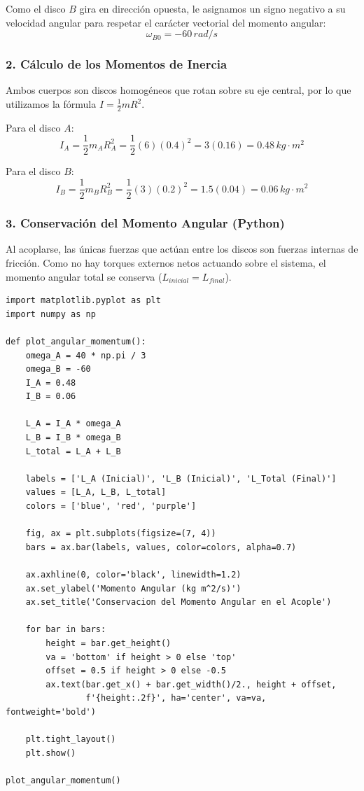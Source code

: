\documentclass[12pt, a4paper]{article}
\begin{document}
Como el disco $B$ gira en dirección opuesta, le asignamos un signo negativo a su velocidad angular para respetar el carácter vectorial del momento angular:
$$\omega_{B0} = -60 \, \si{rad/s}$$

\subsubsection*{2. Cálculo de los Momentos de Inercia}
Ambos cuerpos son discos homogéneos que rotan sobre su eje central, por lo que utilizamos la fórmula $I = \frac{1}{2} m R^2$.

Para el disco $A$:
$$I_A = \frac{1}{2} m_A R_A^2 = \frac{1}{2} (6) (0.4)^2 = 3 (0.16) = 0.48 \, \si{kg\cdot m^2}$$

Para el disco $B$:
$$I_B = \frac{1}{2} m_B R_B^2 = \frac{1}{2} (3) (0.2)^2 = 1.5 (0.04) = 0.06 \, \si{kg\cdot m^2}$$

\subsubsection*{3. Conservación del Momento Angular (Python)}
Al acoplarse, las únicas fuerzas que actúan entre los discos son fuerzas internas de fricción. Como no hay torques externos netos actuando sobre el sistema, el momento angular total se conserva ($L_{inicial} = L_{final}$).

\begin{lstlisting}
import matplotlib.pyplot as plt
import numpy as np

def plot_angular_momentum():
    omega_A = 40 * np.pi / 3
    omega_B = -60
    I_A = 0.48
    I_B = 0.06
    
    L_A = I_A * omega_A
    L_B = I_B * omega_B
    L_total = L_A + L_B
    
    labels = ['L_A (Inicial)', 'L_B (Inicial)', 'L_Total (Final)']
    values = [L_A, L_B, L_total]
    colors = ['blue', 'red', 'purple']
    
    fig, ax = plt.subplots(figsize=(7, 4))
    bars = ax.bar(labels, values, color=colors, alpha=0.7)
    
    ax.axhline(0, color='black', linewidth=1.2)
    ax.set_ylabel('Momento Angular (kg m^2/s)')
    ax.set_title('Conservacion del Momento Angular en el Acople')
    
    for bar in bars:
        height = bar.get_height()
        va = 'bottom' if height > 0 else 'top'
        offset = 0.5 if height > 0 else -0.5
        ax.text(bar.get_x() + bar.get_width()/2., height + offset,
                f'{height:.2f}', ha='center', va=va, fontweight='bold')
                
    plt.tight_layout()
    plt.show()

plot_angular_momentum()
\end{lstlisting}
\end{document}

